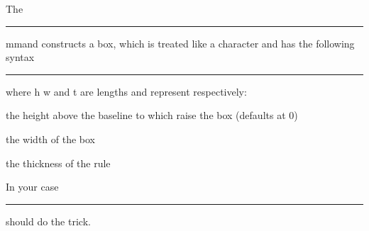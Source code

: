 The \rule command constructs a box, which is treated like a character and has the following syntax  \rule[h]{w}{t} where h w and t are lengths and represent respectively:

the height above the baseline to which raise the box (defaults at 0)

the width of the box

the thickness of the rule

In your case

\par\noindent\rule{\textwidth}{0.4pt}
should do the trick.

